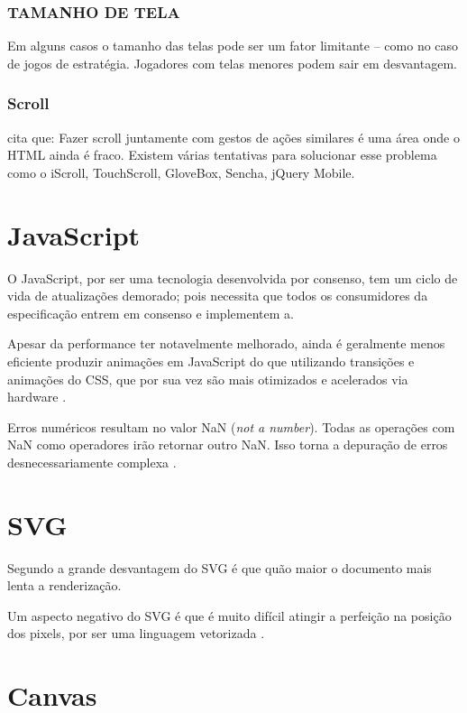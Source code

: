 \begin{draft}
\subsubsection{TAMANHO DE TELA}
Em alguns casos o tamanho das telas pode ser um fator limitante – como
no caso de jogos de estratégia. Jogadores com telas menores podem sair
em desvantagem.

\subsubsection{Scroll}
\autocite[pp. 9]{aSeriousContender} cita que:
Fazer scroll juntamente com gestos de ações similares é uma área
onde o HTML ainda é fraco. Existem várias tentativas para solucionar
esse problema como o iScroll, TouchScroll, GloveBox, Sencha, jQuery
Mobile.

\section{JavaScript}

O JavaScript, por ser uma tecnologia desenvolvida por consenso, tem um
ciclo de vida de atualizações demorado; pois necessita que todos os
consumidores da especificação entrem em consenso e implementem a.

Apesar da performance ter notavelmente melhorado, ainda é geralmente
menos eficiente produzir animações em JavaScript do que utilizando
transições e animações do CSS, que por sua vez são mais otimizados
e acelerados via hardware \autocite{html5mostwanted}.

Erros numéricos resultam no valor NaN (\textit{not a number}).
Todas as operações com NaN como operadores irão retornar outro
NaN. Isso torna a depuração de erros desnecessariamente complexa
\autocite{html5mostwanted}.


\section{SVG}

Segundo \cite{html5mostwanted} a grande desvantagem do SVG é que quão
maior o documento mais lenta a renderização.

Um aspecto negativo do SVG é que é muito difícil atingir a
perfeição na posição dos pixels, por ser uma linguagem vetorizada
\autocite{html5mostwanted}.

\section{Canvas}


\end{draft}

